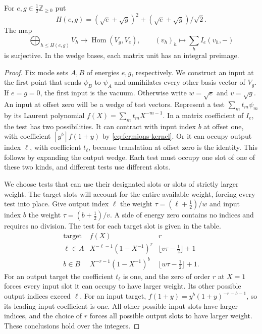 \begin{lemma}\label{lem:width}
For $e,g\in\frac12\mathbb Z_{\ge0}$ put
\[
 H(e,g)=(\sqrt e+\sqrt g)^2+(\sqrt e+\sqrt g)/\sqrt2.
\]
The map
\[
 \bigoplus_{h\le H(e,g)} V_h \longrightarrow
       \operatorname{Hom}(V_g,V_e),\qquad
 (v_h)_h\longmapsto\sum_h I_e(v_h,-)
\]
is surjective. In the wedge bases, each matrix unit has an integral preimage.
\end{lemma}

\begin{proof}
Fix mode sets $A,B$ of energies $e,g$, respectively. We construct
an input at the first point that sends $\psi_B$ to $\psi_A$ and
annihilates every other basis vector of $V_g$. If $e=g=0$, the first
input is the vacuum. Otherwise write $w=\sqrt e$ and $v=\sqrt g$.
An input at offset zero will be a wedge of test vectors. Represent a test
$\sum_m t_m\psi_m$ by its Laurent polynomial $f(X)=\sum_m t_m X^{-m-1}$.
In a matrix coefficient of $I_e$, the test has two possibilities.
It can contract with input index $b$ at offset one, with coefficient
$[y^b]f(1+y)$ by \eqref{eq:fermions-kernel}. Or it can occupy output index
$\ell$, with coefficient $t_\ell$, because translation at offset zero is
the identity. This follows by expanding the output wedge. Each test must
occupy one slot of one of these two kinds, and different tests use different
slots.

We choose tests that can use their designated slots or slots of strictly
larger weight. The target slots will account for the entire available
weight, forcing every test into place. Give output index $\ell$ the
weight $\tau=(\ell+\tfrac12)/w$ and input index $b$ the weight
$\tau=(b+\tfrac12)/v$. A side of energy zero contains
no indices and requires no division. The test for each target slot is given
in the table.
\[
\begin{array}{c|c|c}
\text{target}& f(X)& r\\ \hline
\ell\in A&X^{-\ell-1}(1-X^{-1})^r&
   \lfloor v\tau-\tfrac12\rfloor+1\\
b\in B&X^{-r-1}(1-X^{-1})^b&
   \lfloor w\tau-\tfrac12\rfloor+1 .
\end{array}
\]
For an output target the coefficient $t_\ell$ is one, and the zero of order
$r$ at $X=1$ forces every input slot it can occupy to have larger weight.
Its other possible output indices exceed $\ell$. For an input target,
$f(1+y)=y^b(1+y)^{-r-b-1}$, so its leading input coefficient is one.
All other possible input slots have larger indices, and the choice of $r$
forces all possible output slots to have larger weight. These conclusions
hold over the integers.


\end{proof}
